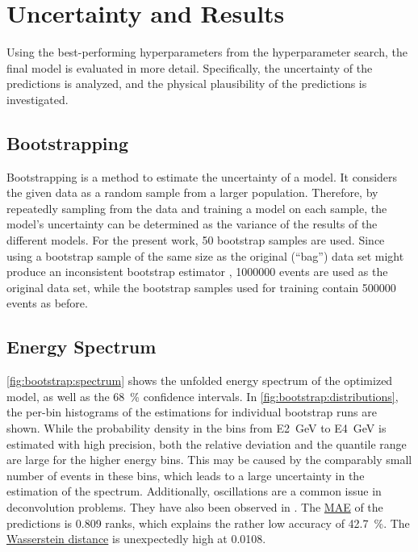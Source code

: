 \section{Uncertainty and Results}
Using the best-performing hyperparameters from the hyperparameter search, %
the final model is evaluated in more detail.
Specifically,
  the uncertainty of the predictions is analyzed, %
  and the physical plausibility of the predictions is investigated.


\subsection{Bootstrapping}
Bootstrapping \cite{bootstrap} is a method to estimate the uncertainty of a model.
It considers the given data as a random sample from a larger population.
Therefore,
by repeatedly sampling from the data and training a model on each sample,
the model's uncertainty can be determined
as the variance of the results of the different models.
%
For the present work, \num{50} bootstrap samples are used.
Since using a bootstrap sample of the same size as the original (\enquote{bag}) data set
might produce an inconsistent bootstrap estimator \cite{bootstrap_samplesize},
\num{1000000} events are used as the original data set,
while the bootstrap samples used for training contain \num{500000} events as before.


\subsection{Energy Spectrum}
\autoref{fig:bootstrap:spectrum} shows the unfolded energy spectrum of the optimized model,
as well as the \SI{68}{\percent} confidence intervals.
In \autoref{fig:bootstrap:distributions},
the per-bin histograms of the estimations for individual bootstrap runs are shown.
While the probability density in the bins from \SI{E2}{\giga\electronvolt} to \SI{E4}{\giga\electronvolt} is estimated with high precision,
both the relative deviation and the quantile range are large for the higher energy bins.
This may be caused by the comparably small number of events in these bins,
which leads to a large uncertainty in the estimation of the spectrum.
Additionally,
oscillations are a common issue in deconvolution problems.
They have also been observed in \cite{dsea_samuel}.
%
The \hyperref[sec:unfolding:metrics:mae]{\ac{MAE}} of the predictions is \num{0.809} ranks,
  which explains the rather low accuracy of \SI{42.7}{\percent}.
The \hyperref[sec:unfolding:metrics:wasserstein]{Wasserstein distance}
is unexpectedly high at \num{0.0108}.

